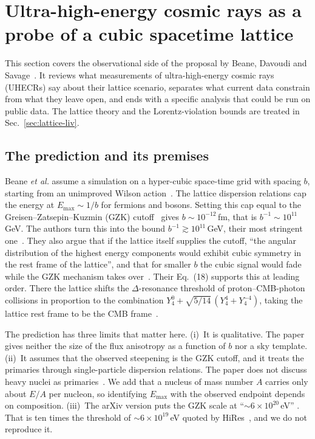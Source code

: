 \section{Ultra-high-energy cosmic rays as a probe of a cubic spacetime lattice}
\label{sec:uhecr}

This section covers the observational side of the proposal by Beane, Davoudi
and Savage~\cite{Beane2014constraints}. It reviews what measurements of
ultra-high-energy cosmic rays (UHECRs) say about their lattice scenario,
separates what current data constrain from what they leave open, and ends with
a specific analysis that could be run on public data. The lattice theory and
the Lorentz-violation bounds are treated in Sec.~\ref{sec:lattice-liv}.

\subsection{The prediction and its premises}
\label{sec:uhecr:prediction}

Beane \emph{et al.} assume a simulation on a hyper-cubic space-time grid with
spacing $b$, starting from an unimproved Wilson action~\cite{Beane2014constraints}.
The lattice dispersion relations cap the energy at $E_{\max}\sim 1/b$ for
fermions and bosons. Setting this cap equal to the Greisen--Zatsepin--Kuzmin
(GZK) cutoff~\cite{Greisen1966end,Zatsepin1966upper} gives
$b\sim10^{-12}$\,fm, that is $b^{-1}\sim10^{11}$\,GeV. The authors turn this into
the bound $b^{-1}\gtrsim10^{11}$\,GeV, their most stringent
one~\cite{Beane2014constraints}. They also argue that if the lattice itself
supplies the cutoff, ``the angular distribution of the highest energy
components would exhibit cubic symmetry in the rest frame of the lattice'',
and that for smaller $b$ the cubic signal would fade while the GZK mechanism
takes over~\cite{Beane2014constraints}. Their Eq.~(18) supports this at leading
order. There the lattice shifts the $\Delta$-resonance threshold of
proton--CMB-photon collisions in proportion to the combination
$Y_4^0+\sqrt{5/14}\,(Y_4^4+Y_4^{-4})$, taking the lattice rest frame to be the
CMB frame~\cite{Beane2014constraints}.

The prediction has three limits that matter here.
(i)~It is qualitative. The paper gives neither the size of the flux anisotropy
as a function of $b$ nor a sky template.
(ii)~It assumes that the observed steepening is the GZK cutoff, and it treats
the primaries through single-particle dispersion relations. The paper does not
discuss heavy nuclei as primaries~\cite{Beane2014constraints}. We add that a
nucleus of mass number $A$ carries only about $E/A$ per nucleon, so identifying
$E_{\max}$ with the observed endpoint depends on composition.
(iii)~The arXiv version puts the GZK scale at ``$\sim6\times10^{20}$\,eV''
\cite{Beane2014constraints}. That is ten times the threshold of
$\sim6\times10^{19}$\,eV quoted by HiRes~\cite{HiRes2008first}, and
we do not reproduce it.

